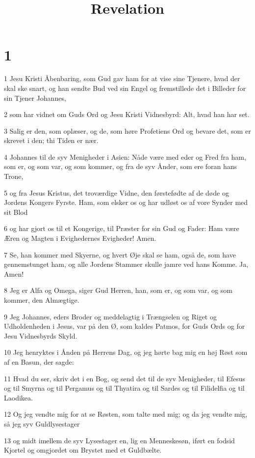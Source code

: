 

\title{Revelation}


\chapter{1}

\par 1 Jesu Kristi Åbenbaring, som Gud gav ham for at vise sine Tjenere, hvad der skal ske snart, og han sendte Bud ved sin Engel og fremstillede det i Billeder for sin Tjener Johannes,
\par 2 som har vidnet om Guds Ord og Jesu Kristi Vidnesbyrd: Alt, hvad han har set.
\par 3 Salig er den, som oplæser, og de, som høre Profetiens Ord og bevare det, som er skrevet i den; thi Tiden er nær.
\par 4 Johannes til de syv Menigheder i Asien: Nåde være med eder og Fred fra ham, som er, og som var, og som kommer, og fra de syv Ånder, som ere foran hans Trone,
\par 5 og fra Jesus Kristus, det troværdige Vidne, den førstefødte af de døde og Jordens Kongers Fyrste. Ham, som elsker os og har udløst os af vore Synder med sit Blod
\par 6 og har gjort os til et Kongerige, til Præster for sin Gud og Fader: Ham være Æren og Magten i Evighedernes Evigheder! Amen.
\par 7 Se, han kommer med Skyerne, og hvert Øje skal se ham, også de, som have gennemstunget ham, og alle Jordens Stammer skulle jamre ved hans Komme. Ja, Amen!
\par 8 Jeg er Alfa og Omega, siger Gud Herren, han, som er, og som var, og som kommer, den Almægtige.
\par 9 Jeg Johannes, eders Broder og meddelagtig i Trængselen og Riget og Udholdenheden i Jesus, var på den Ø, som kaldes Patmos, for Guds Ords og for Jesu Vidnesbyrds Skyld.
\par 10 Jeg henryktes i Ånden på Herrens Dag, og jeg hørte bag mig en høj Røst som af en Basun, der sagde:
\par 11 Hvad du ser, skriv det i en Bog, og send det til de syv Menigheder, til Efesus og til Smyrna og til Pergamus og til Thyatira og til Sardes og til Filidelfia og til Laodikea.
\par 12 Og jeg vendte mig for at se Røsten, som talte med mig; og da jeg vendte mig, så jeg syv Guldlysestager
\par 13 og midt imellem de syv Lysestager en, lig en Menneskesøn, iført en fodsid Kjortel og omgjordet om Brystet med et Guldbælte.
